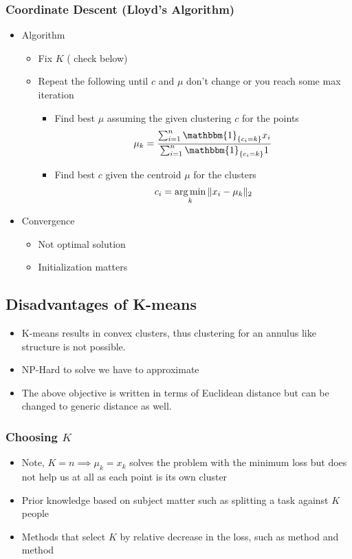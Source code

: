 \documentclass{article}
\begin{document}
\subsubsection{Coordinate Descent (Lloyd's Algorithm)}
\begin{itemize}
    \item Algorithm
        \begin{itemize}
            \item Fix $K$ ( check below)
            \item Repeat the following until $c$ and $\mu$ don't change or you reach some max iteration
            \begin{itemize}
                \item Find best $\mu$ assuming the given clustering $c$ for the points
                    $$\mu_k = \frac{\sum_{i=1}^n \mathbbm{1}_{\{c_i=k\}} x_i}{\sum_{i=1}^n \mathbbm{1}_{\{c_i=k\}} 1}$$
                \item Find best $c$ given the centroid $\mu$ for the clusters
                    $$c_i = \operatorname*{arg\,min}_{k} \Vert x_i-\mu_k \Vert_2$$
            \end{itemize}
        \end{itemize}
    \item Convergence
        \begin{itemize}
            \item Not optimal solution
            \item Initialization matters
        \end{itemize}
\end{itemize}

\subsection{Disadvantages of K-means}
\begin{itemize}
    \item K-means results in convex clusters, thus clustering for an annulus like structure is not possible.
    \item NP-Hard to solve we have to approximate
    \item The above objective is written in terms of Euclidean distance but can be changed to generic distance as well.
\end{itemize}

\subsubsection{Choosing $K$}
\begin{itemize}
    \item Note, $K=n \implies \mu_k = x_k$ solves the problem with the minimum loss but does not help us at all as each point is its own cluster
    \item Prior knowledge based on subject matter such as splitting a task against $K$ people
    \item Methods that select $K$ by relative decrease in the loss, such as  method and  method
\end{itemize}
\end{document}
